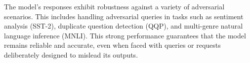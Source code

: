 The model's responses exhibit robustness against a variety of adversarial scenarios. This includes handling adversarial queries in tasks such as sentiment analysis (SST-2), duplicate question detection (QQP), and multi-genre natural language inference (MNLI). This strong performance guarantees that the model remains reliable and accurate, even when faced with queries or requests deliberately designed to mislead its outputs.